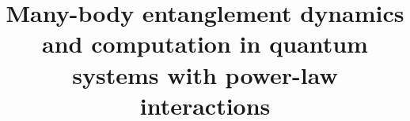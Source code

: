 
\title{Many-body entanglement dynamics and computation in quantum systems with power-law interactions}

% 



\frontmatter
\pagestyle{empty}
\singlespacing

\pagestyle{plain}
\setcounter{page}{2}


\tableofcontents %

\listoffigures

\newpage
{}
\mainmatter



% 






% 

\appendix







\singlespacing
\backmatter


\printbibliography[heading=bibintoc]%




